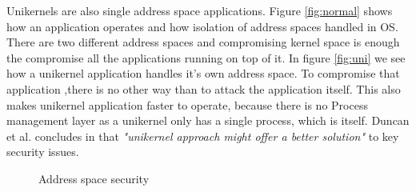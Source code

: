 Unikernels are also single address space applications. Figure \ref{fig:normal} shows how an application operates and how isolation of address spaces handled in OS. There are two different address spaces and compromising kernel space is enough the compromise all the applications running on top of it. In figure \ref{fig:uni} we see how a unikernel application handles it's own address space. To compromise that application ,there is no other way than to attack the application itself. This also makes unikernel application faster to operate, because there is no Process management layer as a unikernel only has a single process, which is itself. Duncan et al. concludes in \cite{Duncan2017} that \textit{"unikernel approach might offer a better solution"} to key security issues.
\begin{figure}[htbp]
    \centering
    \hfill
    \caption{Address space security}\label{fig:single-space}
  \end{figure}

